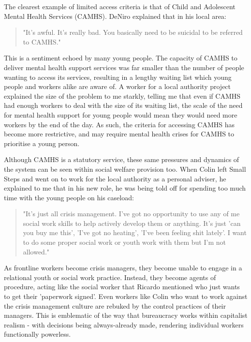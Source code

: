 The clearest example of limited access criteria is that of Child and Adolescent Mental Health Services (CAMHS). DeNiro explained that in his local area:
\begin{quote}
"It's awful. It's really bad. You basically need to be suicidal to be referred to CAMHS."
\end{quote}
This is a sentiment echoed by many young people. The capacity of CAMHS to deliver mental health support services was far smaller than the number of people wanting to access its services, resulting in a lengthy waiting list which young people and workers alike are aware of. A worker for a local authority project explained the size of the problem to me starkly, telling me that even if CAMHS had enough workers to deal with the size of its waiting list, the scale of the need for mental health support for young people would mean they would need more workers by the end of the day. As such, the criteria for accessing CAMHS has become more restrictive, and may require mental health crises for CAMHS to prioritise a young person. 

Although CAMHS is a statutory service, these same pressures and dynamics of the system can be seen within social welfare provision too. When Colin left Small Steps and went on to work for the local authority as a personal adviser, he explained to me that in his new role, he was being told off for spending too much time with the young people on his caseload:
\begin{quote}
"It's just all crisis management. I've got no opportunity to use any of me social work skills to help actively develop them or anything. It's just 'can you buy me this', 'I've got no heating', 'I've been feeling shit lately'. I want to do some proper social work or youth work with them but I'm not allowed."
\end{quote}
As frontline workers become crisis managers, they become unable to engage in a relational youth or social work practice. Instead, they become agents of procedure, acting like the social worker that Ricardo mentioned who just wants to get their 'paperwork signed'. Even workers like Colin who want to work against the crisis management culture are rebuked by the control practices of their managers. This is emblematic of the way that bureaucracy works within capitalist realism - with decisions being always-already made, rendering individual workers functionally powerless.

